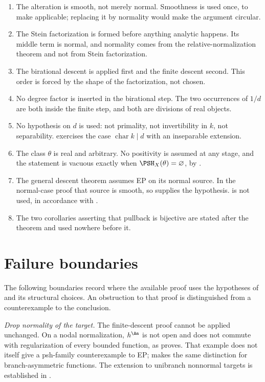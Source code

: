 \begin{enumerate}
\item The alteration is smooth, not merely normal.  Smoothness is used
      once, to make  applicable; replacing it
      by normality would make the argument circular.
\item The Stein factorization is formed before anything analytic happens.
      Its middle term is normal, and normality comes from the
      relative-normalization theorem and not from Stein factorization.
\item The birational descent is applied first and the finite descent
      second.  This order is forced by the shape of the factorization, not
      chosen.
\item No degree factor is inserted in the birational step.  The two
      occurrences of $1/d$ are both inside the finite step, and both are
      divisions of real objects.
\item No hypothesis on $d$ is used: not primality, not invertibility in
      $k$, not separability.   exercises
      the case $\operatorname{char}k\mid d$ with an inseparable extension.
\item The class $\theta$ is real and arbitrary.  No positivity is
      assumed at any stage, and the statement is vacuous exactly when
      $\PSH_X(\theta)=\varnothing$, by .
\item The general descent theorem assumes EP on its normal source.
      In the normal-case proof that source is smooth, so
       supplies the hypothesis.
       is not used, in accordance with
      .
\item The two corollaries asserting that pullback is bijective are stated
      after the theorem and used nowhere before it.
\end{enumerate}

\section{Failure boundaries}
\label{sec:ch42-failure}

The following boundaries record where the available proof uses the
hypotheses of  and its structural choices.
An obstruction to that proof is distinguished from a counterexample
to the conclusion.

\emph{Drop normality of the target.}  The finite-descent proof cannot
be applied unchanged.  On a nodal normalization, $h^{\An}$ is not
open and does not commute with regularization of every bounded
function, as  proves.  That example
does not itself give a psh-family counterexample to EP;
 makes the same distinction for
branch-asymmetric functions.  The extension to unibranch nonnormal
targets is established in
.


